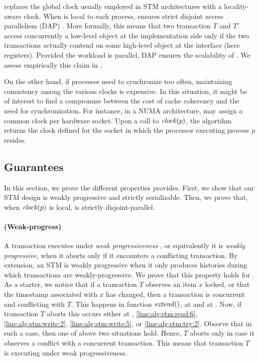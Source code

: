  replaces the global clock usually employed in STM architectures with a locality-aware clock.
When  is local to each process,  ensures strict disjoint access parallelism (DAP) \cite{Attiya2015}.
More formally, this means that two transaction $T$ and $T'$ access concurrently a low-level object at the implementation side only if the two transactions actually contend on some high-level object at the interface (here registers).
Provided the workload is parallel, DAP ensures the scalability of .
We assess empirically this claim in .

On the other hand, if processes need to synchronize too often, maintaining consistency among the various clocks is expensive.
In this situation, it might be of interest to find a compromise between the cost of cache coherency and the need for synchronization.
For instance, in a NUMA architecture,  may assign a common clock per hardware socket.
Upon a call to $\clockOf{p}$, the algortihm returns the clock defined for the socket in which the processor executing process $p$ resides.

\subsection{Guarantees}

In this section, we prove the different properties  provides.
First, we show that our STM design is weakly progressive and strictly serializable.
Then, we prove that, when $\clockOf{p}$ is local,  is strictly disjoint-parallel.

\paragraph{(Weak-progress)}
A transaction executes under \emph{weak progressiveness} \cite{Guerraoui:2009}, or equivalently it is \emph{weakly progressive}, when it aborts only if it encounters a conflicting transaction.
By extension, an STM is weakly progressive when it only produces histories during which transactions are weakly-progressive.
We prove that this property holds for .
As a starter, we notice that if a transaction $T$ observes an item $x$ locked, or that the timestamp associated with $x$ has changed, then a transaction is concurrent and conflicting with $T$.
This happens in function $\stmExtend{}$, at  and at .
Now, if transaction $T$ aborts this occurs either at , \ref{line:alg:stm:read:6}, \ref{line:alg:stm:write:2}, \ref{line:alg:stm:write:5}, or \ref{line:alg:stm:try:2}.
Observe that in such a case, then one of above two situations hold.
Hence, $T$ aborts only in case it observes a conflict with a concurrent transaction.
This means that transaction $T$ is executing under weak progressiveness.


